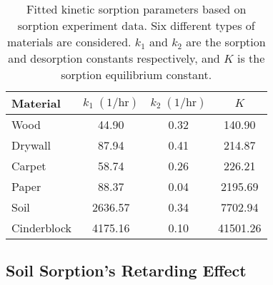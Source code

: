 \begin{table}[htb!]
  \caption{Fitted kinetic sorption parameters based on sorption experiment data. Six different types of materials are considered. $k_1$ and $k_2$ are the sorption and desorption constants respectively, and $K$ is the sorption equilibrium constant.}
  \label{tbl:sorption_fit}
  \centering
  \begin{tabular}{l c c c}
    \toprule
    Material & $k_1 \; \mathrm{(1/hr)}$ & $k_2 \; \mathrm{(1/hr)}$ & $K$ \\
    \hline
    Wood & 44.90 & 0.32 & 140.90 \\
    Drywall & 87.94 & 0.41 & 214.87 \\
    Carpet & 58.74 & 0.26 & 226.21 \\
    Paper & 88.37 & 0.04 & 2195.69 \\
    Soil & 2636.57 & 0.34 & 7702.94 \\
    Cinderblock & 4175.16 & 0.10 & 41501.26 \\
    \bottomrule
  \end{tabular}
\end{table}

\subsection{Soil Sorption's Retarding Effect}\label{sec:retardation_effect}


